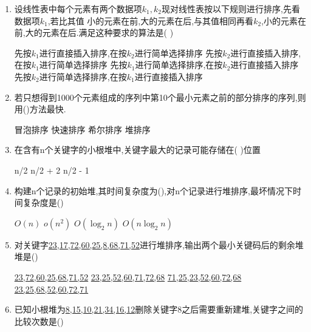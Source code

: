\documentclass[12pt, a4paper, oneside, UTF8]{ctexbook}
\begin{document}
\begin{enumerate}
    \item 设线性表中每个元素有两个数据项$k_1,k_2$现对线性表按以下规则进行排序,先看数据项$k_1$,若比其值
    小的元素在前,大的元素在后,与其值相同再看$k_2$,小的元素在前,大的元素在后.满足这种要求的算法是(   ) 
    \begin{choices}[1]
        \task 先按$k_1$进行直接插入排序,在按$k_2$进行简单选择排序
        \task 先按$k_2$进行直接插入排序,在按$k_1$进行简单选择排序
        \task 先按$k_1$进行简单选择排序,在按$k_2$进行直接插入排序
        \task 先按$k_2$进行简单选择排序,在按$k_1$进行直接插入排序
    \end{choices}

    \item 若只想得到1000个元素组成的序列中第10个最小元素之前的部分排序的序列,则用()方法最快. 
    \begin{choices}
        \task 冒泡排序
        \task 快速排序
        \task 希尔排序
        \task 堆排序
    \end{choices}

    \item 在含有n个关键字的小根堆中,关键字最大的记录可能存储在(   )位置 
    \begin{choices}
        \task n/2 
        \task n/2 + 2 
        \task n/2 - 1
    \end{choices}

    \item 构建n个记录的初始堆,其时间复杂度为(),对n个记录进行堆排序,最坏情况下时间复杂度是()
    \begin{choices}
        \task $O(n)$
        \task $o(n^2)$
        \task $O(\log_2{n})$
        \task $O(n\log_2{n})$
    \end{choices}

    \item 对关键字\underline{23,17,72,60,25,8,68,71,52}进行堆排序,输出两个最小关键码后的剩余堆堆是()
    \begin{choices}[2]
        \task \underline{23,72,60,25,68,71,52}
        \task \underline{23,25,52,60,71,72,68}
        \task \underline{71,25,23,52,60,72,68}
        \task \underline{23,25,68,52,60,72,71}
    \end{choices}

    \item 已知小根堆为\underline{8,15,10,21,34,16,12}删除关键字8之后需要重新建堆,关键字之间的比较次数是()
    \begin{choices}
    \end{choices}


\end{enumerate}
\end{document}
